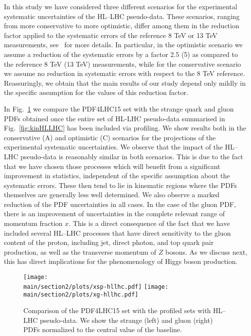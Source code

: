 In this study we have considered three
different scenarios for the
experimental systematic uncertainties of the HL--LHC pseudo-data.
    These scenarios, ranging from more conservative to more optimistic, differ among them in
    the reduction factor
    applied to the systematic errors of the reference
    8 TeV or 13 TeV measurements, see~\cite{Khalek:2018mdn}
    for more details.
    In particular, in the optimistic scenario we assume a reduction
    of the systematic errors by a factor 2.5 (5) as compared to the
    reference 8 TeV (13 TeV) measurements, while for
    the conservative scenario we assume no reduction in systematic
    errors with respect to the 8 TeV reference.
    Reassuringly, we obtain that the main results of our
    study depend only mildly in the specific assumption for
    the values of this reduction factor.

    In Fig.~\ref{fig:PDFratios}  we compare the PDF4LHC15 set
    with the strange quark and gluon PDFs obtained once the entire
    set of HL-LHC pseudo-data summarised in Fig.~\ref{fig:kinHLLHC}
    has been included via profiling.
    We show results both in the conservative (A) and optimistic (C) scenarios
    for the projections of the experimental systematic uncertainties.
    We observe that the
  impact of the HL--LHC pseudo-data is reasonably similar
  in both scenarios.
  This is due to the fact that we have chosen
  those processes which will benefit from a significant improvement in statistics, independent of the specific assumption about the systematic errors. These then tend to lie in kinematic regions where the PDFs themselves are generally less
  well determined.
  We also observe
  a marked reduction of the PDF uncertainties in all cases.
  In the case of the gluon PDF, there is an improvement of
  uncertainties in the complete relevant range of momentum
  fraction $x$.
  This is a direct consequence of the fact that
  we have included several HL--LHC processes
  that have direct sensitivity to the gluon
  content of the proton, including jet, direct photon, and top quark pair
  production, as well as the transverse momentum of $Z$ bosons.
  As we discuss next, this has direct implications for the phenomenology of Higgs
  boson production.
      
\begin{figure}[t]
  \begin{center}
    \texttt{[image: \\main/section2/plots/xsp-hllhc.pdf]}
\texttt{[image: \\main/section2/plots/xg-hllhc.pdf]}
\caption{\small Comparison of the PDF4LHC15 set with the profiled sets
  with HL--LHC pseudo-data.
  We show the strange (left) and gluon (right) PDFs
  normalized to the central value of
  the baseline.
     \label{fig:PDFratios} }
  \end{center}
\end{figure}

